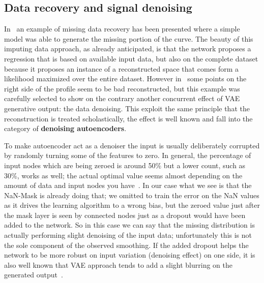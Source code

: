 \subsection{Data recovery and signal denoising}
\label{section:recovery}
In~\Figure{\ref{fig:missing data example}} an example of missing data recovery has been presented where a simple  model was able to generate the missing portion of the curve. The beauty of this imputing data approach, as already anticipated, is that the network proposes a regression that is based on available input data, but also on the complete dataset because it proposes an instance of a reconstructed space that comes form a likelihood maximized over the entire dataset.
However in~\Figure{\ref{fig:missing data example_b}} some points on the right side of the profile seem to be bad reconstructed, but this example was carefully selected to show on the contrary another concurrent effect of \acs{VAE} generative output: the data denoising.
This exploit the same principle that the reconstruction is treated scholastically, the effect is well known and fall into the category of \textbf{denoising autoencoders}.

To make autoencoder act as a denoiser the input is usually deliberately corrupted by randomly turning some of the features to zero. In general, the percentage of input nodes which are being zeroed is around 50\% but a lower count, such as 30\%, works as well; the actual optimal value seems almost depending on the amount of data and input nodes you have~\cite{ae_denoise}. In our case what we see is that the NaN-Mask is already doing that; we omitted to train the error on the NaN values as it drives the learning algorithm to a wrong bias, but the zeroed value just after the mask layer is seen by connected nodes just as a dropout would have been added to the network. So in this case we can say that the missing distribution is actually performing slight denoising of the input data; unfortunately this is not the sole component of the observed smoothing. If the added dropout helps the network to be more robust on input variation (denoising effect) on one side, it is also well known that VAE approach tends to add a slight blurring on the generated output~\cite{ghosh2019variational}. 

